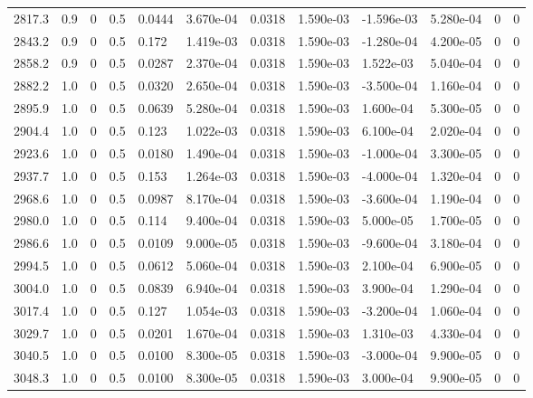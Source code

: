 \documentclass[preview]{standalone}
\begin{document}
{{{{{{{\begin{tabular}{L{1.2cm}C{1.2cm} C{0.3cm}C{0.5cm} C{1.4cm}C{1.4cm} C{1.4cm}C{1.4cm} C{1.6cm}C{1.6cm} C{1.6cm}C{1.6cm}}
  2817.3  &   0.9  & 0     & 0.5 &  0.0444  & 3.670e-04  &  0.0318&   1.590e-03& -1.596e-03 & 5.280e-04   &  0 & 0  \\ 
  2843.2  &   0.9  & 0     & 0.5 &  0.172  & 1.419e-03  &  0.0318&   1.590e-03& -1.280e-04 & 4.200e-05   &  0 & 0  \\ 
  2858.2  &   0.9  & 0     & 0.5 &  0.0287  & 2.370e-04  &  0.0318&   1.590e-03& 1.522e-03 & 5.040e-04   &  0 & 0  \\ 
  2882.2  &   1.0  & 0     & 0.5 &  0.0320  & 2.650e-04  &  0.0318&   1.590e-03& -3.500e-04 & 1.160e-04   &  0 & 0  \\ 
  2895.9  &   1.0  & 0     & 0.5 &  0.0639  & 5.280e-04  &  0.0318&   1.590e-03& 1.600e-04 & 5.300e-05   &  0 & 0  \\ 
  2904.4  &   1.0  & 0     & 0.5 &  0.123  & 1.022e-03  &  0.0318&   1.590e-03& 6.100e-04 & 2.020e-04   &  0 & 0  \\ 
  2923.6  &   1.0  & 0     & 0.5 &  0.0180  & 1.490e-04  &  0.0318&   1.590e-03& -1.000e-04 & 3.300e-05   &  0 & 0  \\ 
  2937.7  &   1.0  & 0     & 0.5 &  0.153  & 1.264e-03  &  0.0318&   1.590e-03& -4.000e-04 & 1.320e-04   &  0 & 0  \\ 
  2968.6  &   1.0  & 0     & 0.5 &  0.0987  & 8.170e-04  &  0.0318&   1.590e-03& -3.600e-04 & 1.190e-04   &  0 & 0  \\ 
  2980.0  &   1.0  & 0     & 0.5 &  0.114  & 9.400e-04  &  0.0318&   1.590e-03& 5.000e-05 & 1.700e-05   &  0 & 0  \\ 
  2986.6  &   1.0  & 0     & 0.5 &  0.0109  & 9.000e-05  &  0.0318&   1.590e-03& -9.600e-04 & 3.180e-04   &  0 & 0  \\ 
  2994.5  &   1.0  & 0     & 0.5 &  0.0612  & 5.060e-04  &  0.0318&   1.590e-03& 2.100e-04 & 6.900e-05   &  0 & 0  \\ 
  3004.0  &   1.0  & 0     & 0.5 &  0.0839  & 6.940e-04  &  0.0318&   1.590e-03& 3.900e-04 & 1.290e-04   &  0 & 0  \\ 
  3017.4  &   1.0  & 0     & 0.5 &  0.127  & 1.054e-03  &  0.0318&   1.590e-03& -3.200e-04 & 1.060e-04   &  0 & 0  \\ 
  3029.7  &   1.0  & 0     & 0.5 &  0.0201  & 1.670e-04  &  0.0318&   1.590e-03& 1.310e-03 & 4.330e-04   &  0 & 0  \\ 
  3040.5  &   1.0  & 0     & 0.5 &  0.0100  & 8.300e-05  &  0.0318&   1.590e-03& -3.000e-04 & 9.900e-05   &  0 & 0  \\ 
  3048.3  &   1.0  & 0     & 0.5 &  0.0100  & 8.300e-05  &  0.0318&   1.590e-03& 3.000e-04 & 9.900e-05   &  0 & 0  \\ 

\end{tabular}}}}}}}}
\end{document}
